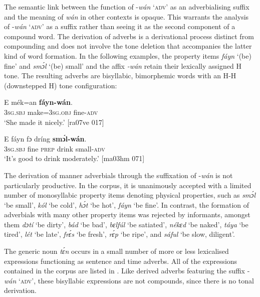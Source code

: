 The semantic link between the function of -\textit{wán} \textsc{‘adv’} as an adverbialising suffix and the meaning of \textit{wán} in other contexts is opaque. This warrants the analysis of -\textit{wán} ‘\textsc{adv’} as a suffix rather than seeing it as the second component of a compound word. The derivation of adverbs is a derivational process distinct from compounding and does not involve the tone deletion that accompanies the latter kind of word formation. In the following examples, the property items \textit{fáyn} ‘(be) fine’  and \textit{smɔ́l} ‘(be) small’  and the affix \textit{-wán} retain their lexically assigned H tone. The resulting adverbs are bisyllabic, bimorphemic words with an H\textsc{{}-}H (downstepped H) tone configuration:



\ea%
    \label{ex:key:101}
    \gll E    mék=an    \textbf{fáyn-wán}.\\
\textsc{3sg.sbj}  make=\textsc{3sg.obj}  fine\textsc{{}-adv}\\

\glt ‘She made it nicely.’ [ra07ve 017]
\z


\ea%
    \label{ex:key:102}
    \gll E    fáyn    fɔ  dríng  \textbf{smɔ́l-wán}.\\
\textsc{3sg.sbj}  fine    \textsc{prep}  drink  small\textsc{{}-adv}\\

\glt ‘It’s good to drink moderately.’ [ma03hm 071]
\z

The derivation of manner adverbials through the suffixation of -\textit{wán} is not particularly productive. In the corpus, it is unanimously accepted with a limited number of monosyllabic property items denoting physical properties, such as \textit{smɔ́l} ‘be small’, \textit{kól} ‘be cold’, \textit{hɔ́t} ‘be hot’, \textit{fáyn} ‘be fine’. In contrast, the formation of adverbials with many other property items was rejected by informants, amongst them \textit{dɔtí} ‘be dirty’, \textit{bád} ‘be bad’, \textit{bɛlfúl} ‘be satiated’, \textit{nékɛd} ‘be naked’, \textit{táya} ‘be tired’, \textit{lét} ‘be late’, \textit{frɛ́s} ‘be fresh’, \textit{rɛ́p} ‘be ripe’, and \textit{sáful} ‘be slow, diligent’. 


The generic noun \textit{tɛ́n} occurs in a small number of more or less lexicalised expressions functioning as sentence and time adverbs. All of the expressions contained in the corpus are listed in . Like derived adverbs featuring the suffix -\textit{wán} ‘\textsc{adv}’, these bisyllabic expressions are not compounds, since there is no tonal derivation. 



